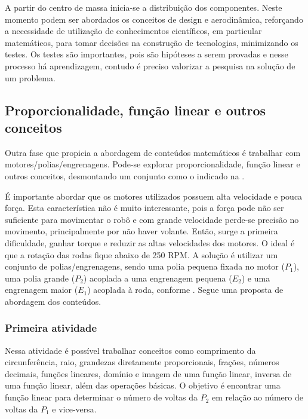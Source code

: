 \documentclass{textolivre}
\begin{document}
A partir do centro de massa inicia-se a distribuição dos componentes. Neste
momento podem ser abordados os conceitos de design e aerodinâmica, reforçando a
necessidade de utilização de conhecimentos científicos, em particular
matemáticos, para tomar decisões na construção de tecnologias, minimizando os
testes. Os testes são importantes, pois são hipóteses a serem provadas e nesse
processo há aprendizagem, contudo é preciso valorizar a pesquisa na solução de
um problema.


\subsection{Proporcionalidade, função linear e outros conceitos}\label{sec-proporcionalidade}
Outra fase que propicia a abordagem de conteúdos matemáticos é trabalhar com
motores/polias/engrenagens. Pode-se explorar proporcionalidade, função linear e
outros conceitos, desmontando um conjunto como o indicado na .

É importante abordar que os motores utilizados possuem alta velocidade e pouca
força. Esta característica não é muito interessante, pois a força pode não ser
suficiente para movimentar o robô e com grande velocidade perde-se precisão no
movimento, principalmente por não haver volante. Então, surge a primeira
dificuldade, ganhar torque e reduzir as altas velocidades dos motores. O ideal
é que a rotação das rodas fique abaixo de 250 RPM. A solução é utilizar um
conjunto de polias/engrenagens, sendo uma polia pequena fixada no motor ($P_1$),
uma polia grande ($P_2$) acoplada a uma engrenagem pequena ($E_2$) e uma engrenagem
maior ($E_1$) acoplada à roda, conforme . Segue uma proposta de abordagem
dos conteúdos.

\subsubsection{Primeira atividade}\label{sec-primeira-atividade}
Nessa atividade é possível trabalhar conceitos como comprimento da
circunferência, raio, grandezas diretamente proporcionais, frações, números
decimais, funções lineares, domínio e imagem de uma função linear, inversa de
uma função linear, além das operações básicas. O objetivo é encontrar uma
função linear para determinar o número de voltas da $P_2$ em relação ao número
de voltas da $P_1$ e vice-versa.
\end{document}
